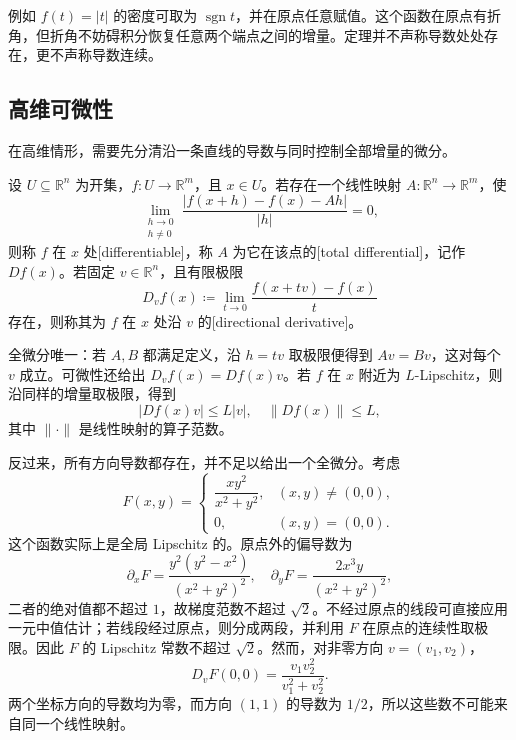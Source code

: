 例如 \(f(t)=|t|\) 的密度可取为 \(\operatorname{sgn}t\)，并在原点任意赋值。这个函数在原点有折角，但折角不妨碍积分恢复任意两个端点之间的增量。定理并不声称导数处处存在，更不声称导数连续。

\subsection{高维可微性}
\label{b1:subsec:160202}

在高维情形，需要先分清沿一条直线的导数与同时控制全部增量的微分。

\begin{definition}\label{b1:def:frechet-differentiability}
设 \(U\subseteq\mathbb R^n\) 为开集，\(f:U\rightarrow\mathbb R^m\)，且 \(x\in U\)。若存在一个线性映射 \(A:\mathbb R^n\rightarrow\mathbb R^m\)，使
\[
 \lim_{\substack{h\to0\\h\ne0}}
       \frac{|f(x+h)-f(x)-Ah|}{|h|}=0,
\]
则称 \(f\) 在 \(x\) 处[differentiable]，称 \(A\) 为它在该点的[total differential]，记作 \(Df(x)\)。若固定 \(v\in\mathbb R^n\)，且有限极限
\[
 D_vf(x)\coloneqq\lim_{t\to0}\frac{f(x+tv)-f(x)}t
\]
存在，则称其为 \(f\) 在 \(x\) 处沿 \(v\) 的[directional derivative]。
\end{definition}

全微分唯一：若 \(A,B\) 都满足定义，沿 \(h=tv\) 取极限便得到 \(Av=Bv\)，这对每个 \(v\) 成立。可微性还给出 \(D_vf(x)=Df(x)v\)。若 \(f\) 在 \(x\) 附近为 \(L\)-Lipschitz，则沿同样的增量取极限，得到
\[
 |Df(x)v|\leq L|v|,\quad \|Df(x)\|\leq L,
\]
其中 \(\|\cdot\|\) 是线性映射的算子范数。

\ProseParagraphBreak

反过来，所有方向导数都存在，并不足以给出一个全微分。考虑
\[
 F(x,y)=
 \begin{cases}
 \dfrac{xy^2}{x^2+y^2},&(x,y)\ne(0,0),\\[4pt]
 0,&(x,y)=(0,0).
 \end{cases}
\]
这个函数实际上是全局 Lipschitz 的。原点外的偏导数为
\[
 \partial_xF=\frac{y^2(y^2-x^2)}{(x^2+y^2)^2},
 \quad
 \partial_yF=\frac{2x^3y}{(x^2+y^2)^2},
\]
二者的绝对值都不超过 \(1\)，故梯度范数不超过 \(\sqrt2\)。不经过原点的线段可直接应用一元中值估计；若线段经过原点，则分成两段，并利用 \(F\) 在原点的连续性取极限。因此 \(F\) 的 Lipschitz 常数不超过 \(\sqrt2\)。然而，对非零方向 \(v=(v_1,v_2)\)，
\[
 D_vF(0,0)=\frac{v_1v_2^2}{v_1^2+v_2^2}.
\]
两个坐标方向的导数均为零，而方向 \((1,1)\) 的导数为 \(1/2\)，所以这些数不可能来自同一个线性映射。

